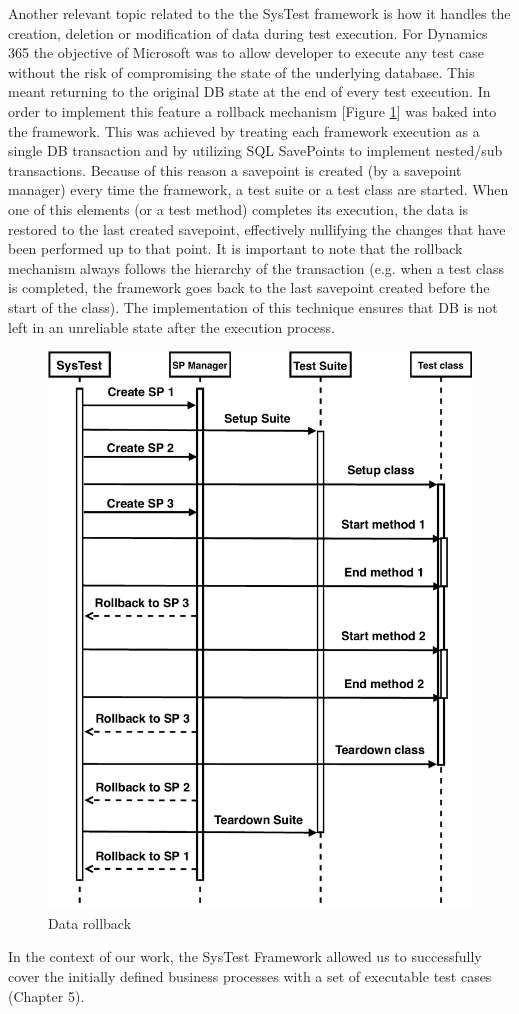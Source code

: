 Another relevant topic related to the the SysTest framework is how it handles the creation, deletion or modification of data during test execution. For Dynamics 365 the objective of Microsoft was to allow developer to execute any test case without the risk of compromising the state of the underlying database. This meant returning to the original DB state at the end of every test execution. In order to implement this feature a rollback mechanism [Figure \ref{fig:SysTestRollback}] was baked into the framework. This was achieved by treating each framework execution as a single DB transaction and by utilizing SQL SavePoints to implement nested/sub transactions. Because of this reason a savepoint is created (by a savepoint manager) every time the framework, a test suite or a test class are started. When one of this elements (or a test method) completes its execution, the data is restored to the last created savepoint, effectively nullifying the changes that have been performed up to that point. It is important to note that the rollback mechanism always follows the hierarchy of the transaction (e.g. when a test class is completed, the framework goes back to the last savepoint created before the start of the class). The implementation of this technique ensures that DB is not left in an unreliable state after the execution process.

\begin{figure}[ht]
	\centering
	\includegraphics[scale=0.65]{Images/SysTestRollback.pdf}
	\caption{Data rollback }
	\label{fig:SysTestRollback}
\end{figure}

In the context of our work, the SysTest Framework allowed us to successfully cover the initially defined business processes with a set of executable test cases (Chapter 5).
